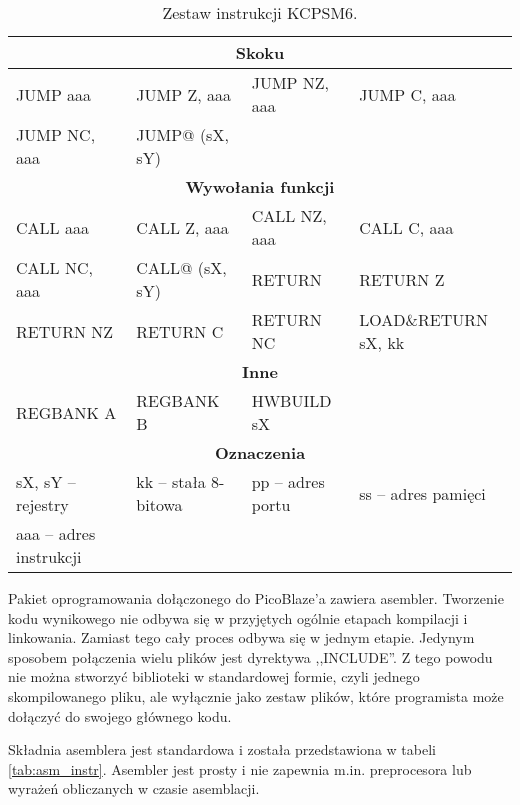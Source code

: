 \begin{table}[h]
\begin{center}
{\begin{tabular}{|l|l|l|l|}
			\hline \multicolumn{4}{|c|}{ \textbf{Skoku}  } \\ \hline
JUMP aaa&
JUMP Z, aaa&
JUMP NZ, aaa&
JUMP C, aaa\\
JUMP NC, aaa&
JUMP@ (sX, sY)&&\\


			\hline \multicolumn{4}{|c|}{ \textbf{Wywołania funkcji} } \\ \hline
CALL aaa&
CALL Z, aaa&
CALL NZ, aaa&
CALL C, aaa\\
CALL NC, aaa&
CALL@ (sX, sY)&
RETURN&
RETURN Z\\
RETURN NZ&
RETURN C&
RETURN NC&
LOAD\&RETURN sX, kk\\


			\hline \multicolumn{4}{|c|}{ \textbf{Inne} } \\ \hline
REGBANK A&
REGBANK B&
HWBUILD sX&\\

			\hline \multicolumn{4}{|c|}{ \textbf{Oznaczenia} } \\ \hline
			sX, sY -- rejestry &
			kk -- stała 8-bitowa &
			pp -- adres portu &
			ss -- adres pamięci \\
			\hline
			aaa -- adres instrukcji &&& \\
			
			\hline
		\end{tabular}
	}
	\caption{ Zestaw instrukcji KCPSM6. \cite{PicoBlaze_User_Guide}}
	\label{tab:kcpsm6asm}
	\end{center}
\end{table}


Pakiet oprogramowania dołączonego do PicoBlaze'a zawiera asembler. Tworzenie kodu wynikowego nie odbywa się w przyjętych ogólnie etapach kompilacji i linkowania. Zamiast tego cały proces odbywa się w jednym etapie. Jedynym sposobem połączenia wielu plików jest dyrektywa ,,INCLUDE''. Z tego powodu nie można stworzyć biblioteki w standardowej formie, czyli jednego skompilowanego pliku, ale wyłącznie jako zestaw plików, które programista może dołączyć do swojego głównego kodu.


Składnia asemblera jest standardowa i została przedstawiona w tabeli \ref{tab:asm_instr}. Asembler jest prosty i nie zapewnia m.in. preprocesora lub wyrażeń obliczanych w czasie asemblacji.


